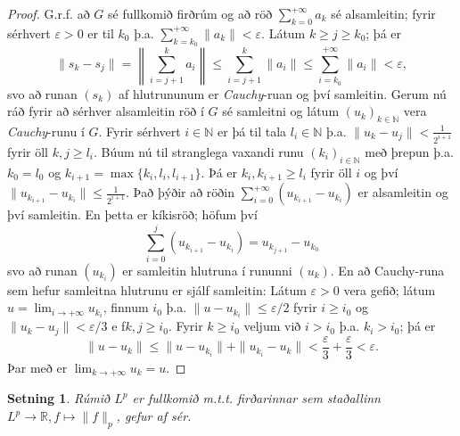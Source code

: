 \documentclass[a4paper,icelandic,11pt]{book}
\theoremstyle{plain}      \newtheorem{setn}{Setning}[chapter]
\theoremstyle{definition} \newtheorem{skilgr}[setn]{Skilgreining}
\theoremstyle{remark}     \newtheorem*{ath}{Athugasemd}
\newcommand{\R}{\mathbb R}
\newcommand{\N}{\mathbb N}
\begin{document}
\begin{proof}
  G.r.f. að $G$ sé fullkomið firðrúm og að röð
  $\sum_{k=0}^{+\infty}a_{k}$ sé alsamleitin; fyrir sérhvert
  $\varepsilon > 0$ er til $k_{0}$
  þ.a. $\sum_{k=k_{0}}^{+\infty}\|a_{k}\|<\varepsilon$. Látum $k\ge
  j\ge k_{0}$; þá er
  \[
  \|s_{k}-s_{j}\|
  = \left\|
    \sum_{i=j+1}^{k}a_{i}
  \right\|
  \le \sum_{i=j+1}^{k}\|a_{i}\|
  \le \sum_{i=k_{0}}^{+\infty}\|a_{i}\|
  < \varepsilon,
  \]
  svo að runan $(s_{k})$ af hlutrununum er \emph{Cauchy}-ruan og því
  samleitin. Gerum nú ráð fyrir að sérhver alsamleitin röð í $G$ sé
  samleitni og látum $(u_{k})_{k\in\N}$ vera \emph{Cauchy}-runu í
  $G$. Fyrir sérhvert $i\in\N$ er þá til tala $l_{i}\in\N$
  þ.a. $\|u_{k}-u_{j}\|<\frac 1{2^{i+1}}$ fyrir öll $k,j\ge
  l_{i}$. Búum nú til stranglega vaxandi runu $(k_{i})_{i\in\N}$ með
  þrepun þ.a. $k_{0}=l_{0}$ og
  $k_{i+1}=\max\{k_{i},l_{i},l_{i+1}\}$. Þá er $k_{i},k_{i+1}\ge
  l_{i}$ fyrir öll $i$ og því $\|u_{k_{i+1}} -
  u_{k_{i}}\|\le\frac{1}{2^{i+1}}$. Það þýðir að röðin
  $\sum_{i=0}^{+\infty}(u_{k_{i+1}}-u_{k_{i}})$ er alsamleitin og því
  samleitin. En þetta er kíkisröð; höfum því
  \[
  \sum_{i=0}^{j}(u_{k_{i+1}}-u_{k_{i}}) = u_{k_{j+1}} -u_{k_{0}}
  \]
  svo að runan $(u_{k_{i}})$ er samleitin hlutruna í rununni
  $(u_{k})$. En að Cauchy-runa sem hefur samleitna hlutrunu er sjálf
  samleitin: Látum $\varepsilon > 0$ vera gefið; látum
  $u=\lim_{i\to+\infty}u_{k_{i}}$, finnum $i_{0}$ þ.a. $\|u -
  u_{k_{i}}\|\le\varepsilon / 2$ fyrir $i\ge i_{0}$ og
  $\|u_{k}-u_{j}\| < \varepsilon / 3$ e f$k,j\ge i_{0}$. Fyrir $k\ge
  i_{0}$ veljum við $i > i_{0}$ þ.a. $k_{i} > i_{0}$; þá er
  \[
  \| u - u_{k} \|
  \le \| u - u_{k_{i}} \| + \| u_{k_{i}} - u_{k} \|
  < \frac\varepsilon 3 + \frac\varepsilon 3
  < \varepsilon.
  \]
  Þar með er $\lim_{k\to+\infty}u_{k} = u$.
\end{proof}
\begin{setn}
  Rúmið $L^{p}$ er fullkomið m.t.t. firðarinnar sem staðallinn
  $L^{p}\to\R, f\mapsto \|f\|_{p}$, gefur af sér.
\end{setn}
\end{document}
